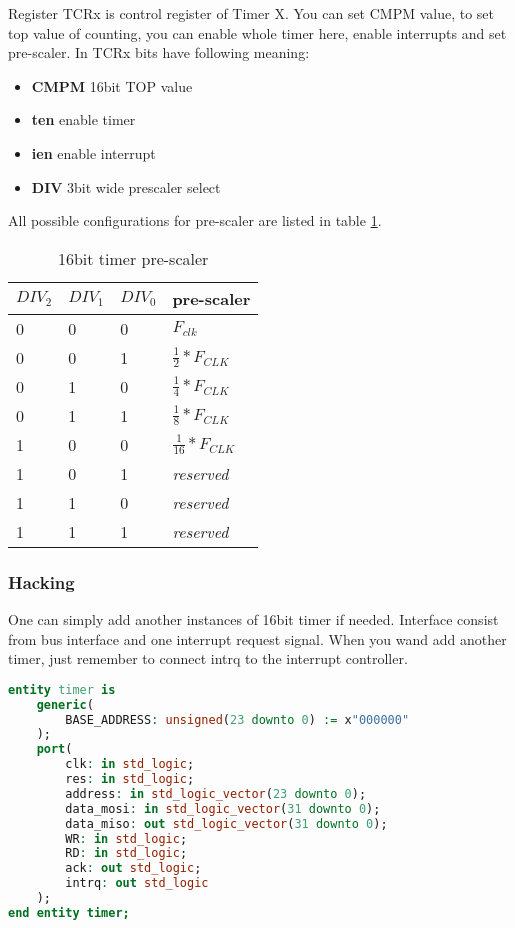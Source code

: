 Register TCRx is control register of Timer X. You can set CMPM value, 
to set top value of counting, you can enable whole timer here, enable 
interrupts and set pre-scaler. In TCRx bits have following meaning:

\begin{itemize}
	\item \textbf{CMPM} 16bit TOP value
	\item \textbf{ten} enable timer
	\item \textbf{ien} enable interrupt
	\item \textbf{DIV} 3bit wide prescaler select
\end{itemize}

All possible configurations for pre-scaler are listed in table \ref{tab:tim_pres}.

\begin{table}[H]
    \centering
    \begin{tabular}{|l|l|l|l|}
        \hline
        \textbf{$DIV_2$} & \textbf{$DIV_1$} & \textbf{$DIV_0$} & \textbf{pre-scaler} \\ \hline
        0 & 0 & 0 & $F_{clk}$ \\ \hline
		0 & 0 & 1 & $\frac{1}{2} * F_{CLK}$  \\ \hline        
		0 & 1 & 0 & $\frac{1}{4} * F_{CLK}$  \\ \hline        
		0 & 1 & 1 & $\frac{1}{8} * F_{CLK}$  \\ \hline
		1 & 0 & 0 & $\frac{1}{16} * F_{CLK}$ \\ \hline
		1 & 0 & 1 & \textit{reserved}    \\ \hline        
		1 & 1 & 0 & \textit{reserved}    \\ \hline        
		1 & 1 & 1 & \textit{reserved}    \\ \hline        
    \end{tabular}
    \caption{16bit timer pre-scaler}
    \label{tab:tim_pres}
\end{table}

\subsubsection{Hacking}

One can simply add another instances of 16bit timer if needed. 
Interface consist from bus interface and one interrupt request signal. 
When you wand add another timer, just remember to connect intrq to the 
interrupt controller.

\begin{lstlisting}[language=VHDL, frame=single]
entity timer is
    generic(
        BASE_ADDRESS: unsigned(23 downto 0) := x"000000"
    );
    port(
        clk: in std_logic;
        res: in std_logic;
        address: in std_logic_vector(23 downto 0);
        data_mosi: in std_logic_vector(31 downto 0);
        data_miso: out std_logic_vector(31 downto 0);
        WR: in std_logic;
        RD: in std_logic;
        ack: out std_logic;
        intrq: out std_logic
    );
end entity timer;
\end{lstlisting}

